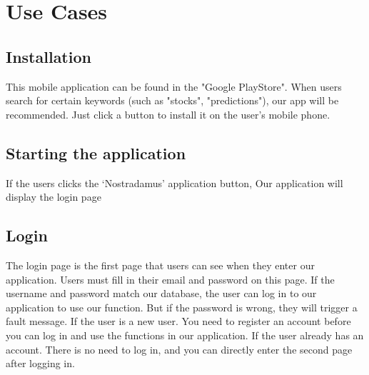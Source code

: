 \documentclass[conference]{IEEEtran}
\begin{document}
    

\section{Use Cases}
\vspace{1\baselineskip}\vspace{1\baselineskip}\vspace{1\baselineskip}\vspace{1\baselineskip}

    \subsection{Installation}
        
            This mobile application can be found in the "Google PlayStore". When users search for certain keywords (such as "stocks", "predictions"), our app will be recommended. Just click a button to install it on the user's mobile phone. \vspace{1\baselineskip}\vspace{1\baselineskip}\vspace{1\baselineskip}
            
     
    \subsection{Starting the application}
    
        If the users clicks the ‘Nostradamus’ application button, Our application will display the login page
        \vspace{1\baselineskip}\vspace{1\baselineskip}
        
    \subsection{Login}
    
        The login page is the first page that users can see when they enter our application. Users must fill in their email and password on this page. If the username and password match our database, the user can log in to our application to use our function. But if the password is wrong, they will trigger a fault message. If the user is a new user. You need to register an account before you can log in and use the functions in our application. If the user already has an account. There is no need to log in, and you can directly enter the second page after logging in.
        
\end{document}
